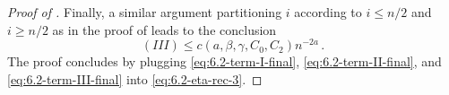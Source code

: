 \documentclass[10pt,a4paper]{amsart}
\begin{document}
\begin{proof}[Proof of ]
Finally, a similar argument partitioning $i$ according to $i\le n/2$ and $i\ge n/2$ as in the proof of  leads to the conclusion
\begin{equation}\label{eq:6.2-term-III-final}
	(III)\le c(a,\beta,\gamma,C_0,C_2) n^{-2a}\,.
\end{equation}
The proof concludes by plugging \eqref{eq:6.2-term-I-final}, \eqref{eq:6.2-term-II-final}, and \eqref{eq:6.2-term-III-final} into \eqref{eq:6.2-eta-rec-3}.
\end{proof}
\end{document}
